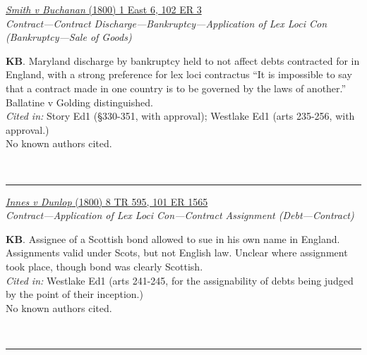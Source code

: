 \documentclass[twoside]{article}
\begin{document}
        \begin{small}
        \begin{center}
        \href{https://heinonline.org/HOL/P?h=hein.engrep/engrf0102&i=7}{\textit{Smith v Buchanan} (1800) 1 East 6, 102 ER 3} \label{41} \\ 
\textit{Contract---Contract Discharge---Bankruptcy---Application of Lex Loci Con (Bankruptcy---Sale of Goods)}\\
        \end{center}
        \textbf{KB}. Maryland discharge by bankruptcy held to not affect debts contracted for in England, with a strong preference for lex loci contractus “It is impossible to say that a contract made in one country is to be governed by the laws of another.” Ballatine v Golding distinguished.\\\textit{Cited in: }Story Ed1 (§330-351, with approval); Westlake Ed1 (arts 235-256, with approval.)\\No known authors cited.
        \end{small}\\
        \rule{\textwidth}{0.5pt}
        

        \begin{small}
        \begin{center}
        \href{https://heinonline.org/HOL/P?h=hein.engrep/engrf0101&i=1569}{\textit{Innes v Dunlop} (1800) 8 TR 595, 101 ER 1565} \label{46} \\ 
\textit{Contract---Application of Lex Loci Con---Contract Assignment (Debt---Contract)}\\
        \end{center}
        \textbf{KB}. Assignee of a Scottish bond allowed to sue in his own name in England. Assignments valid under Scots, but not English law. Unclear where assignment took place, though bond was clearly Scottish.\\\textit{Cited in: }Westlake Ed1 (arts 241-245, for the assignability of debts being judged by the point of their inception.)\\No known authors cited.
        \end{small}\\
        \rule{\textwidth}{0.5pt}
        
\end{document}
